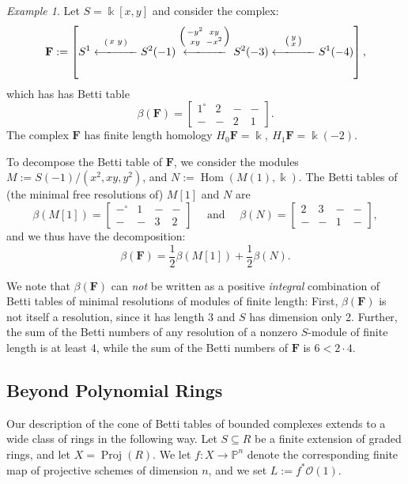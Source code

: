\documentclass[12pt]{amsart}
\theoremstyle{definition}
\theoremstyle{remark}
\newtheorem{example}[lemma]{Example}
\newcommand{\Proj}{\operatorname{Proj}}
\newcommand{\Hom}{\operatorname{Hom}} %
\newcommand{\kk}{\Bbbk}
\newcommand{\PP}{\mathbb{P}}
\newcommand{\cO}{\mathcal{O}}
\newcommand{\FF}{\mathbf{F}}
\newcommand{\defi}[1]{\textsf{#1}} %
\newcommand{\zp}{\circ}
\begin{document}
\begin{example}
Let $S=\kk[x,y]$ and consider the complex:
\[
\FF := \left[S^1\overset{\left(\begin{smallmatrix}x&y\end{smallmatrix}\right)}{\xlongleftarrow{\hspace*{1.1cm}}} S^2(-1)\overset{\left(\begin{smallmatrix}-y^2&xy\\xy&-x^2\end{smallmatrix}\right)}{\xlongleftarrow{\hspace*{1.1cm}}} S^2(-3)\overset{\left(\begin{smallmatrix}y\\x\end{smallmatrix}\right)}{\xlongleftarrow{\hspace*{1.1cm}}} S^1(-4)\right],
\]
which has has Betti table 
$$
\beta(\FF)=\begin{bmatrix} 1^\circ&2&-&-\\-&-&2&1\end{bmatrix}.
$$
The complex $\FF$ has finite length homology $H_{0}\FF = \kk,\ H_{1}\FF = \kk(-2)$. 

To decompose the Betti table of $\FF$, we consider the
modules $M:=S(-1)/(x^2,xy,y^2)$, and $N:=\Hom(M(1),\kk)$.  The Betti tables of (the minimal free resolutions of) $M[1]$ and $N$ are
\[
\beta(M[1])=\begin{bmatrix}
-^\zp&1&-&-\\
-&-&3&2
\end{bmatrix}
\quad \text{ and } \quad
\beta(N)=\begin{bmatrix}
2&3&-&-\\
-&-&1&-
\end{bmatrix},
\]
and we thus have the decomposition:
\[
\beta(\FF)=
\frac{1}{2}\beta(M[1])
+
\frac{1}{2}\beta(N).
\]


We note that $\beta(\FF)$ can \emph{not} be written as a positive \emph{integral} combination of Betti tables of minimal resolutions of modules of finite length: First, $\beta(\FF)$ is not itself a resolution, since it has length 3 and $S$ has dimension only 2. 
Further,  the sum of the Betti numbers of any resolution of a nonzero $S$-module of finite length is at least 4, while the sum of the Betti numbers of $\FF$ is $6<2\cdot 4$.
\end{example}



\subsection*{Beyond Polynomial Rings}
Our description of the cone of Betti tables of bounded complexes
extends to a wide class of rings in the following way. 
Let $S\subseteq R$ be a finite extension of graded rings, and let
$X=\Proj(R)$.  We let $f\colon X\to \PP^n$ denote the corresponding finite
map of projective schemes of dimension $n$, and we set $L:=f^*\cO(1)$.
%
\end{document}
